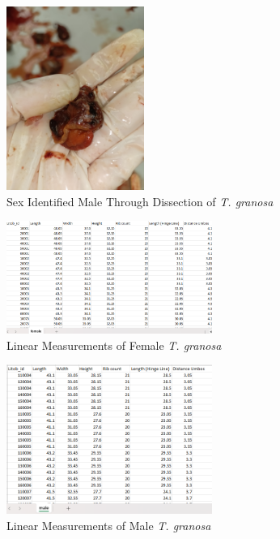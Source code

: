\begin{figure}[!htbp]
	\centering
	\includegraphics[width=0.4\textwidth, angle=90]{figures/dissecting male.jpg}
	\caption{Sex Identified Male Through Dissection of \textit{T. granosa}}
\end{figure}

\begin{figure}[!htbp]
	\centering
	\includegraphics[width=0.6\textwidth]{figures/female_dataset.png}
	\caption{Linear Measurements of Female \textit{T. granosa}}
\end{figure}

\begin{figure}[!htbp]
	\centering
	\includegraphics[width=0.6\textwidth]{figures/male_dataset.png}
	\caption{Linear Measurements of Male \textit{T. granosa}}
\end{figure}

